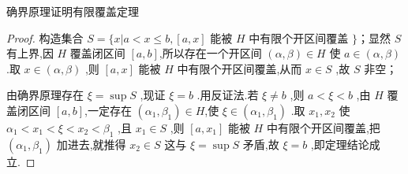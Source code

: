 \begin{proposition}
	确界原理证明有限覆盖定理
\end{proposition}

\begin{proof}
	构造集合 $S = \{x | a < x \leqslant b, [a, x]$ 能被 $H$ 中有限个开区间覆盖 $\}$；显然 $S$ 有上界,因 $H$ 覆盖闭区间 $[a, b]$,所以存在一个开区间 $(\alpha, \beta) \in H$ 使 $a \in (\alpha, \beta)$ .取 $x \in (\alpha, \beta)$ ,则 $[a, x]$ 能被 $H$ 中有限个开区间覆盖,从而 $x \in S$ ,故 $S$ 非空；

由确界原理存在 $\xi = \sup S$ ,现证 $\xi = b$ .用反证法.若 $\xi \neq b$ ,则 $a < \xi < b$ ,由 $H$ 覆盖闭区间 $[a, b]$,一定存在 $(\alpha_1, \beta_1) \in H$,使 $\xi \in (\alpha_1, \beta_1)$ .取 $x_1, x_2$ 使 $\alpha_1 < x_1 < \xi < x_2 < \beta_1$ ,且 $x_1 \in S$ ,则 $[a, x_1]$ 能被 $H$ 中有限个开区间覆盖,把 $(\alpha_1, \beta_1)$ 加进去,就推得 $x_2 \in S$ 这与 $\xi = \sup S$ 矛盾,故 $\xi = b$ ,即定理结论成立.
\end{proof}


